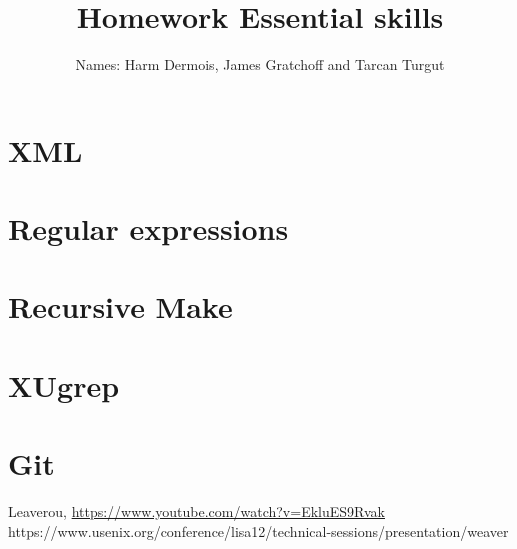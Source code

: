 \documentclass[12pt,a4paper]{article}
\begin{document}
\title{Homework Essential skills}
\author{Names: Harm Dermois, James Gratchoff and Tarcan Turgut }
\date{}
\maketitle

\section{XML}

\section{Regular expressions}

\section{Recursive Make}

\section{XUgrep}

\section{Git}


\begin{thebibliography}{9}
	Leaverou,
	\url{https://www.youtube.com/watch?v=EkluES9Rvak}
	https://www.usenix.org/conference/lisa12/technical-sessions/presentation/weaver

\end{thebibliography}
\end{document}
